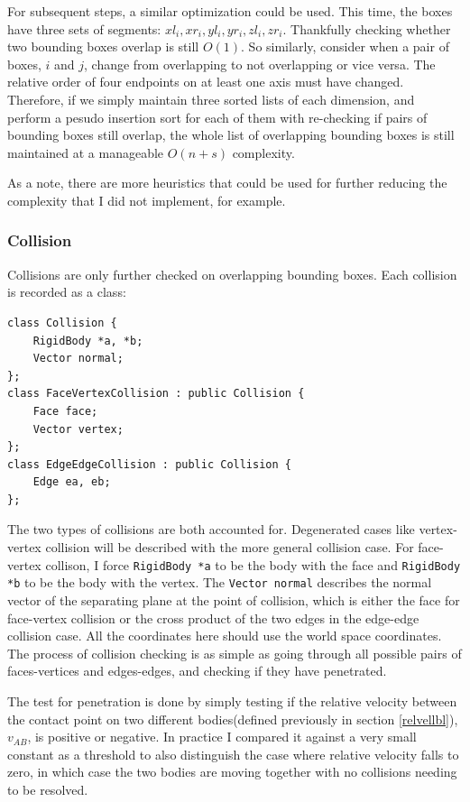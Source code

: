 \documentclass[12pt,a4paper,twoside,openright]{report}
\newcommand{\code}{\texttt}
\begin{document}
\begin{itemize}
For subsequent steps, a similar optimization could be used. This time, the boxes have three sets of segments: $xl_i, xr_i, yl_i, yr_i, zl_i, zr_i$. Thankfully checking whether two bounding boxes overlap is still $O(1)$. So similarly, consider when a pair of boxes, $i$ and $j$, change from overlapping to not overlapping or vice versa. The relative order of four endpoints on at least one axis must have changed. Therefore, if we simply maintain three sorted lists of each dimension, and perform a pesudo insertion sort for each of them with re-checking if pairs of bounding boxes still overlap, the whole list of overlapping bounding boxes is still maintained at a manageable $O(n + s)$ complexity.

As a note, there are more heuristics that could be used for further reducing the complexity that I did not implement, \cite{zhou1999analysis} for example.
\end{itemize}

\subsubsection{Collision}

Collisions are only further checked on overlapping bounding boxes. Each collision is recorded as a class:

\begin{verbatim}
class Collision {
    RigidBody *a, *b;
    Vector normal;
};
class FaceVertexCollision : public Collision {
    Face face;
    Vector vertex;
};
class EdgeEdgeCollision : public Collision {
    Edge ea, eb;
};
\end{verbatim}

The two types of collisions are both accounted for. Degenerated cases like vertex-vertex collision will be described with the more general collision case. For face-vertex collison, I force \code{RigidBody *a} to be the body with the face and \code{RigidBody *b} to be the body with the vertex. The \code{Vector normal} describes the normal vector of the separating plane at the point of collision, which is either the face for face-vertex collision or the cross product of the two edges in the edge-edge collision case. All the coordinates here should use the world space coordinates. The process of collision checking is as simple as going through all possible pairs of faces-vertices and edges-edges, and checking if they have penetrated. 

The test for penetration is done by simply testing if the relative velocity between the contact point on two different bodies(defined previously in section \ref{relvellbl}), $v_{AB}$, is positive or negative. In practice I compared it against a very small constant as a threshold to also distinguish the case where relative velocity falls to zero, in which case the two bodies are moving together with no collisions needing to be resolved.
\end{document}
